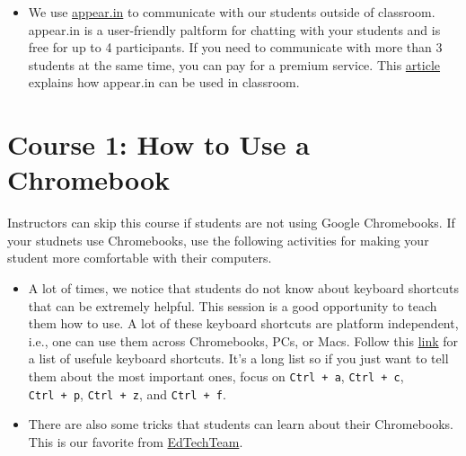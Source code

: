 \documentclass[]{book}
\begin{document}
\begin{itemize}
\item
  We use \href{www.appear.in}{appear.in} to communicate with our students outside of classroom. appear.in is a user-friendly paltform for chatting with your students and is free for up to 4 participants. If you need to communicate with more than 3 students at the same time, you can pay for a premium service. This \href{https://appear.in/information/education/rachelle-poth/}{article} explains how appear.in can be used in classroom.
\end{itemize}

\hypertarget{chromebook}{%
\chapter*{Course 1: How to Use a Chromebook}\label{chromebook}}

Instructors can skip this course if students are not using Google Chromebooks. If your studnets use Chromebooks, use the following activities for making your student more comfortable with their computers.

\begin{itemize}
\item
  A lot of times, we notice that students do not know about keyboard shortcuts that can be extremely helpful. This session is a good opportunity to teach them how to use. A lot of these keyboard shortcuts are platform independent, i.e., one can use them across Chromebooks, PCs, or Macs. Follow this \href{https://www.thegeekstuff.com/2016/04/chromebook-keyboard-shortcuts/}{link} for a list of usefule keyboard shortcuts. It's a long list so if you just want to tell them about the most important ones, focus on \texttt{Ctrl\ +\ a}, \texttt{Ctrl\ +\ c}, \texttt{Ctrl\ +\ p}, \texttt{Ctrl\ +\ z}, and \texttt{Ctrl\ +\ f}.
\item
  There are also some tricks that students can learn about their Chromebooks. This is our favorite from \href{https://twitter.com/edtechteam}{EdTechTeam}.
\end{itemize}
\end{document}

